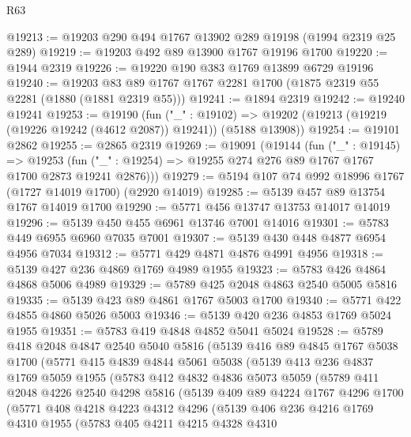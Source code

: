 \begin{lexlean}{R63}
\begin{coremodule}
@19213 := @19203 @290 @494 @1767 @13902 @289 @19198 (@1994 @2319 @25 @289)
@19219 := @19203 @492 @89 @13900 @1767 @19196 @1700
@19220 := @1944 @2319
@19226 := @19220 @190 @383 @1769 @13899 @6729 @19196
@19240 := @19203 @83 @89 @1767 @1767 @2281 @1700 (@1875 @2319 @55 @2281 (@1880 (@1881 @2319 @55)))
@19241 := @1894 @2319
@19242 := @19240 @19241
@19253 := @19190
    (fun ("_" : @19102) =>
    @19202 (@19213 (@19219 (@19226 @19242 (@4612 @2087)) @19241)) (@5188 @13908))
@19254 := @19101 @2862
@19255 := @2865 @2319
@19269 := @19091
    (@19144
      (fun ("_" : @19145) =>
      @19253 (fun ("_" : @19254) => @19255 @274 @276 @89 @1767 @1767 @1700 @2873 @19241 @2876)))
@19279 := @5194 @107 @74 @992 @18996 @1767 (@1727 @14019 @1700) (@2920 @14019)
@19285 := @5139 @457 @89 @13754 @1767 @14019 @1700
@19290 := @5771 @456 @13747 @13753 @14017 @14019
@19296 := @5139 @450 @455 @6961 @13746 @7001 @14016
@19301 := @5783 @449 @6955 @6960 @7035 @7001
@19307 := @5139 @430 @448 @4877 @6954 @4956 @7034
@19312 := @5771 @429 @4871 @4876 @4991 @4956
@19318 := @5139 @427 @236 @4869 @1769 @4989 @1955
@19323 := @5783 @426 @4864 @4868 @5006 @4989
@19329 := @5789 @425 @2048 @4863 @2540 @5005 @5816
@19335 := @5139 @423 @89 @4861 @1767 @5003 @1700
@19340 := @5771 @422 @4855 @4860 @5026 @5003
@19346 := @5139 @420 @236 @4853 @1769 @5024 @1955
@19351 := @5783 @419 @4848 @4852 @5041 @5024
@19528 := @5789
    @418
    @2048
    @4847
    @2540
    @5040
    @5816
    (@5139
      @416
      @89
      @4845
      @1767
      @5038
      @1700
      (@5771
        @415
        @4839
        @4844
        @5061
        @5038
        (@5139
          @413
          @236
          @4837
          @1769
          @5059
          @1955
          (@5783
            @412
            @4832
            @4836
            @5073
            @5059
            (@5789
              @411
              @2048
              @4226
              @2540
              @4298
              @5816
              (@5139
                @409
                @89
                @4224
                @1767
                @4296
                @1700
                (@5771
                  @408
                  @4218
                  @4223
                  @4312
                  @4296
                  (@5139
                    @406
                    @236
                    @4216
                    @1769
                    @4310
                    @1955
                    (@5783
                      @405
                      @4211
                      @4215
                      @4328
                      @4310

\end{coremodule}
\end{lexlean}
